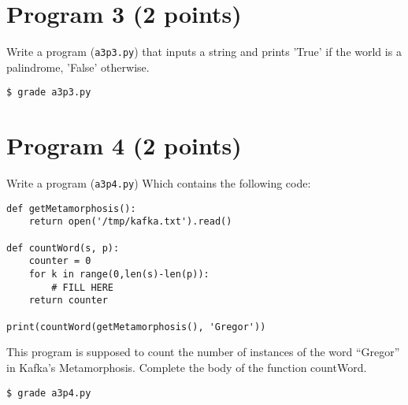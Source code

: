 \documentclass[12pt]{article}
\begin{document}
\section{Program 3 (2 points)}

\noindent Write a program ({\tt a3p3.py})
that inputs a string and prints 'True' if the world is a palindrome,               
'False' otherwise.
\begin{verbatim}
$ grade a3p3.py
\end{verbatim}

\section{Program 4 (2 points)}
\noindent Write a program ({\tt a3p4.py})
Which contains the following code:
\begin{verbatim}
def getMetamorphosis():
    return open('/tmp/kafka.txt').read()

def countWord(s, p):
    counter = 0
    for k in range(0,len(s)-len(p)):
        # FILL HERE
    return counter

print(countWord(getMetamorphosis(), 'Gregor'))
\end{verbatim}
This program is supposed to count the number of instances of the word ``Gregor'' in Kafka's Metamorphosis. Complete the body of the function countWord.

\begin{verbatim}
$ grade a3p4.py  
\end{verbatim}
\end{document}
